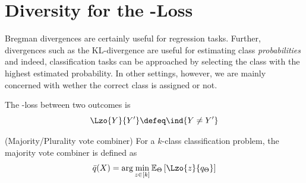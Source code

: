 \documentclass[../main.tex]{subfiles}
\begin{document}







\section{Diversity for the \zeroone-Loss}

Bregman divergences are certainly useful for regression tasks. Further, divergences such as the \textsc{KL}-divergence are useful for estimating class \textit{probabilities} and indeed, classification tasks can be approached by selecting the class with the highest estimated probability.
In other settings, however, we are mainly concerned with wether the correct class is assigned or not. 

\begin{definition}
\label{def:zeroone-loss}
The \zeroone-loss between two outcomes is 
$$
\Lzo{Y}{Y'} \defeq \ind{Y \not= Y'}
$$
\end{definition}

\begin{definition} 
   \label{def:majority-vote} 
    (Majority/Plurality vote combiner) For a $k$-class classification problem, the majority vote combiner is defined as
$$
\bar{q}(X) = \arg\min_{z \in [k]} \mathbb{E}_{\Theta}\left[ \Lzo{z}{q_{\Theta}} \right]  
$$
\end{definition}
\end{document}
